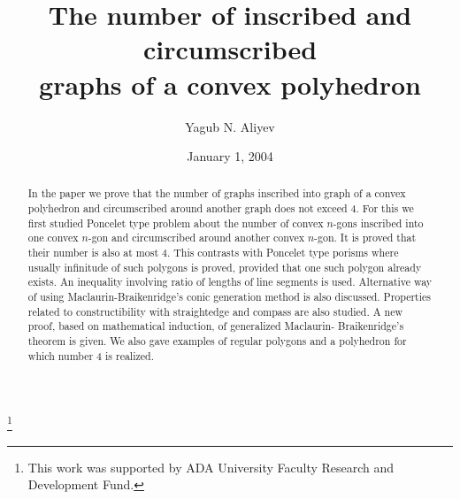 \documentclass{birkjour}
\theoremstyle{definition}
\theoremstyle{remark}
\numberwithin{equation}{section}
\begin{document}
%
%
%
%
%
%
%
%
%


\title[The number of inscribed and circumscribed graphs]
 {The number of inscribed and circumscribed\\ graphs of a convex polyhedron}



\author{Yagub N. Aliyev}

\address{%
School of IT and Engineering\\ 
ADA University\\
Ahmadbey Aghaoglu str. 61 \\
Baku 1008, Azerbaijan}


\thanks{This work was supported by ADA University Faculty Research and Development Fund.}



\date{January 1, 2004}

\begin{abstract}
In the paper we prove that the number of graphs inscribed into graph of a convex polyhedron and circumscribed around another graph does not exceed 4. For this we first studied Poncelet type problem about the number of convex $n$-gons inscribed into one convex $n$-gon and circumscribed around another convex $n$-gon. It is proved that their number is also at most 4. This contrasts with Poncelet type porisms where usually infinitude of such polygons is proved, provided that one such polygon already exists. An inequality involving ratio of lengths of line segments is used. Alternative way of using Maclaurin-Braikenridge's conic generation method is also discussed. Properties related to constructibility with straightedge and compass are also studied. A new proof, based on mathematical induction, of generalized Maclaurin- Braikenridge's theorem is given. We also gave examples of regular polygons and a polyhedron for which number 4 is realized.
\end{abstract}
\end{document}
